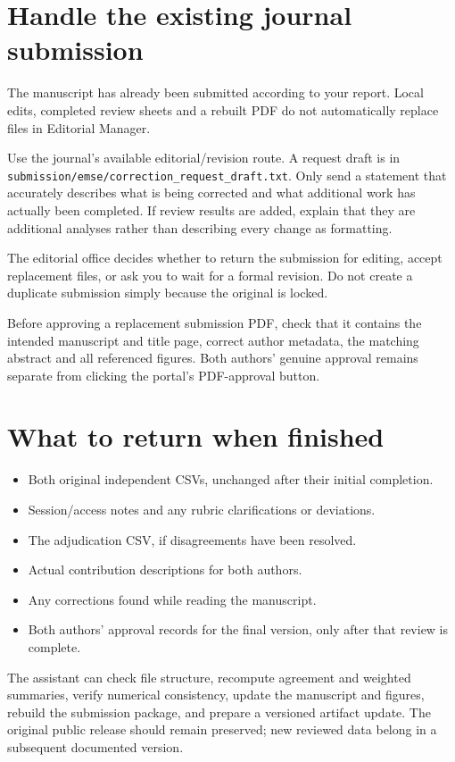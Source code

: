 \documentclass[11pt,a4paper]{article}
\begin{document}
\section{Handle the existing journal submission}


The manuscript has already been submitted according to your report. Local edits, completed review sheets and a rebuilt PDF do not automatically replace files in Editorial Manager.


Use the journal's available editorial/revision route. A request draft is in \nolinkurl{submission/emse/correction_request_draft.txt}. Only send a statement that accurately describes what is being corrected and what additional work has actually been completed. If review results are added, explain that they are additional analyses rather than describing every change as formatting.


The editorial office decides whether to return the submission for editing, accept replacement files, or ask you to wait for a formal revision. Do not create a duplicate submission simply because the original is locked.


Before approving a replacement submission PDF, check that it contains the intended manuscript and title page, correct author metadata, the matching abstract and all referenced figures. Both authors' genuine approval remains separate from clicking the portal's PDF-approval button.


\section{What to return when finished}


\begin{itemize}
\item Both original independent CSVs, unchanged after their initial completion.
\item Session/access notes and any rubric clarifications or deviations.
\item The adjudication CSV, if disagreements have been resolved.
\item Actual contribution descriptions for both authors.
\item Any corrections found while reading the manuscript.
\item Both authors' approval records for the final version, only after that review is complete.
\end{itemize}


The assistant can check file structure, recompute agreement and weighted summaries, verify numerical consistency, update the manuscript and figures, rebuild the submission package, and prepare a versioned artifact update. The original public release should remain preserved; new reviewed data belong in a subsequent documented version.
\end{document}
